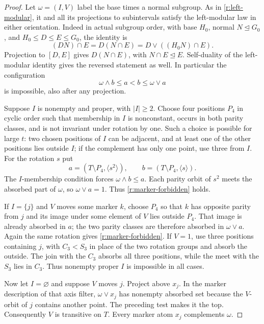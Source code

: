 \begin{proof}
Let $\omega=(I,V)$ label the base times a normal subgroup.
As in \eqref{r:left-modular}, it and all its projections to
subintervals satisfy the left-modular law in either orientation.
Indeed in actual subgroup order, with base $H_0$, normal
$N\trianglelefteq G_0$, and $H_0\le D\le E\le G_0$, the identity is
\[
 (DN)\cap E=D(N\cap E)=D\vee((H_0N)\cap E).
\]
Projection to $[D,E]$ gives $D(N\cap E)$, with
$N\cap E\trianglelefteq E$.  Self-duality of the left-modular
identity gives the reversed statement as well.  In particular the configuration
\begin{equation}\label{r:marker-forbidden}
 \omega\wedge b\le a<b\le\omega\vee a
\end{equation}
is impossible, also after any projection.

Suppose $I$ is nonempty and proper, with $|I|\ge2$.
Choose four positions $P_4$ in cyclic order such that membership
in $I$ is nonconstant, occurs in both parity classes, and is not
invariant under rotation by one.  Such a choice is possible for
large $t$: two chosen positions of $I$ can be adjacent, and at
least one of the other positions lies outside $I$; if the
complement has only one point, use three from $I$.
For the rotation $s$ put
\[
 a=(T\setminus P_4,\langle s^2\rangle),\qquad
 b=(T\setminus P_4,\langle s\rangle).
\]
The $I$-membership condition forces $\omega\wedge b\le a$.
Each parity orbit of $s^2$ meets the absorbed part of $\omega$,
so $\omega\vee a=1$.  Thus \eqref{r:marker-forbidden} holds.

If $I=\{j\}$ and $V$ moves some marker $k$, choose $P_4$ so that
$k$ has opposite parity from $j$ and its image under some element
of $V$ lies outside $P_4$.  That image is already absorbed in $a$;
the two parity classes are therefore absorbed in $\omega\vee a$.
Again the same rotation gives \eqref{r:marker-forbidden}.
If $V=1$, use three positions containing $j$, with $C_3<S_3$
in place of the two rotation groups and absorb the outside.
The join with the $C_3$ absorbs all three positions, while the
meet with the $S_3$ lies in $C_3$.  Thus nonempty proper $I$ is
impossible in all cases.

Now let $I=\varnothing$ and suppose $V$ moves $j$.
Project above $x_j$.  In the marker description of that axis
filter, $\omega\vee x_j$ has nonempty absorbed set because the
$V$-orbit of $j$ contains another point.  The preceding test makes
it the top.  Consequently $V$ is transitive on $T$.
Every marker atom $x_j$ complements $\omega$.


\end{proof}
